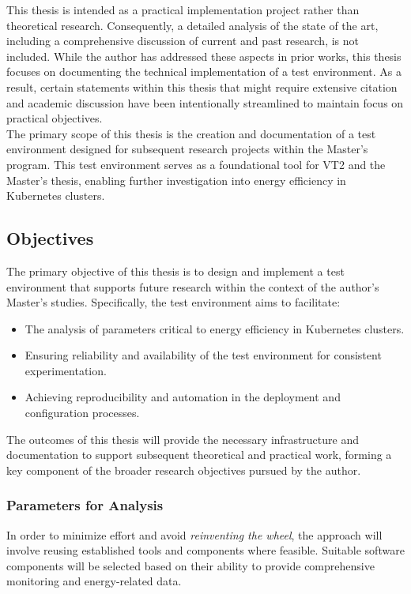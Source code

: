 This thesis is intended as a practical implementation project rather than theoretical research. Consequently, a detailed analysis of the state of the art, including a comprehensive discussion of current and past research, is not included. While the author has addressed these aspects in prior works, this thesis focuses on documenting the technical implementation of a test environment. As a result, certain statements within this thesis that might require extensive citation and academic discussion have been intentionally streamlined to maintain focus on practical objectives.\\
The primary scope of this thesis is the creation and documentation of a test environment designed for subsequent research projects within the Master's program. This test environment serves as a foundational tool for VT2 and the Master's thesis, enabling further investigation into energy efficiency in Kubernetes clusters.\\

\subsection{Objectives}

The primary objective of this thesis is to design and implement a test environment that supports future research within the context of the author's Master's studies. Specifically, the test environment aims to facilitate:
\begin{itemize}
\item The analysis of parameters critical to energy efficiency in Kubernetes clusters.
\item Ensuring reliability and availability of the test environment for consistent experimentation.
\item Achieving reproducibility and automation in the deployment and configuration processes.
\end{itemize}
The outcomes of this thesis will provide the necessary infrastructure and documentation to support subsequent theoretical and practical work, forming a key component of the broader research objectives pursued by the author.

\subsubsection{Parameters for Analysis}
In order to minimize effort and avoid \textit{reinventing the wheel}, the approach will involve reusing established tools and components where feasible. Suitable software components will be selected based on their ability to provide comprehensive monitoring and energy-related data.


